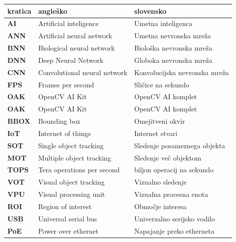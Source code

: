 \documentclass[a4paper,12pt,openright]{book}
\begin{document}
\noindent\begin{tabular}{p{}|p{}|p{}}    %
    {\bf kratica} & {\bf angleško}                      & {\bf slovensko}                      \\ \hline
    {\bf AI}      & Artificial inteligence              & Umetna inteligenca                   \\
    {\bf ANN}     & Artificial neural network           & Umetna nevronska mreža               \\
    {\bf BNN}     & Biological neural network           & Biološka nevronska mreža             \\
    {\bf DNN}     & Deep Neural Network                 & Globoka nevronska mreža              \\
    {\bf CNN}     & \small Convolutional neural network & \small Konvolucijska nevronska mreža \\
    {\bf FPS}     & Frames per second                   & Sličice na sekundo                   \\
    {\bf OAK}     & OpenCV AI Kit                       & OpenCV AI komplet                    \\
    {\bf OAK}     & OpenCV AI Kit                       & OpenCV AI komplet                    \\
    {\bf BBOX}    & Bounding box                        & Omejitveni okvir                     \\
    {\bf IoT}     & Internet of things                  & Internet stvari                      \\
    {\bf SOT}     & \small Single object tracking       & \small Sledenje posameznega objekta  \\
    {\bf MOT}     & Multiple object tracking            & Sledenje več objektom                \\
    {\bf TOPS}    & Tera operations per second          & biljon operacij na sekundo           \\
    {\bf VOT}     & Visual object tracking              & Vizualno sledenje                    \\
    {\bf VPU}     & Visual processing unit              & Vizualna procesna enota              \\
    {\bf ROI}     & Region of interest                  & Območje interesa                     \\
    {\bf USB}     & Universal serial bus                & Univerzalno serijsko vodilo          \\
    {\bf PoE}     & Power over ethernet                 & Napajanje preko etherneta            \\

\end{tabular}
\end{document}
